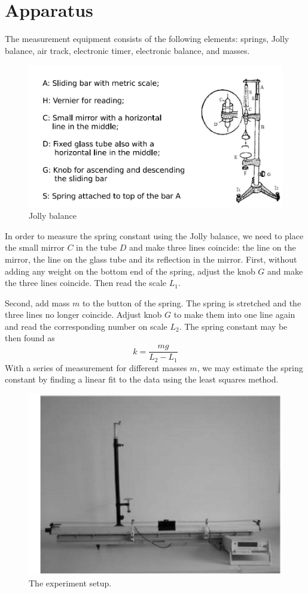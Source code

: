 \documentclass[12pt]{article}
\begin{document}
\section{Apparatus}
The measurement equipment consists of the following elements: springs, Jolly balance,
air track, electronic timer, electronic balance, and masses. 		
\begin{figure}[H]
\centering
\includegraphics[scale=0.5]{P2.jpg}
\caption{Jolly balance}
\end{figure}
In order to measure the spring constant using the Jolly balance, we need to place the
small mirror $C$ in the tube $D$ and make three lines coincide: the line on  the mirror, the line on the glass tube and its reflection in the mirror. First, without
adding any weight on the bottom end of the spring, adjust the knob $G$ and make the
three lines coincide. Then read the scale $L_1$.
\par Second, add mass $m$ to the button of the spring. The spring is stretched and the three lines no longer coincide. Adjust knob $G$ to make them into one line again and read the corresponding number on scale $L_2$. The spring constant may be then found as
\begin{equation}
k=\frac{mg}{L_2-L_1}
\end{equation}
With a series of measurement for different masses $m$, we may estimate the spring constant by finding a linear fit to the data using the least squares method.
\begin{figure}[H]
\centering
\includegraphics[scale=0.5]{P3.jpg}
\caption{The experiment setup.}
\end{figure}
\end{document}
